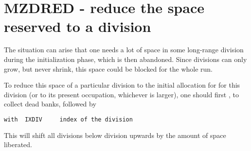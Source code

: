 \section{MZDRED - reduce the space reserved to a division}

The situation can arise that one needs a lot of space in some
long-range division during the initialization phase,
which is then abandoned.
Since divisions can only grow, but never shrink, this space
could be blocked for the whole run.

To reduce this space of a particular division
to the initial allocation for for this division
(or to its present occupation, whichever is larger),
one should first 
, to collect dead banks,
followed by


\begin{verbatim}
with  IXDIV     index of the division
\end{verbatim} 

This will shift all divisions below division  upwards
by the amount of space liberated.
